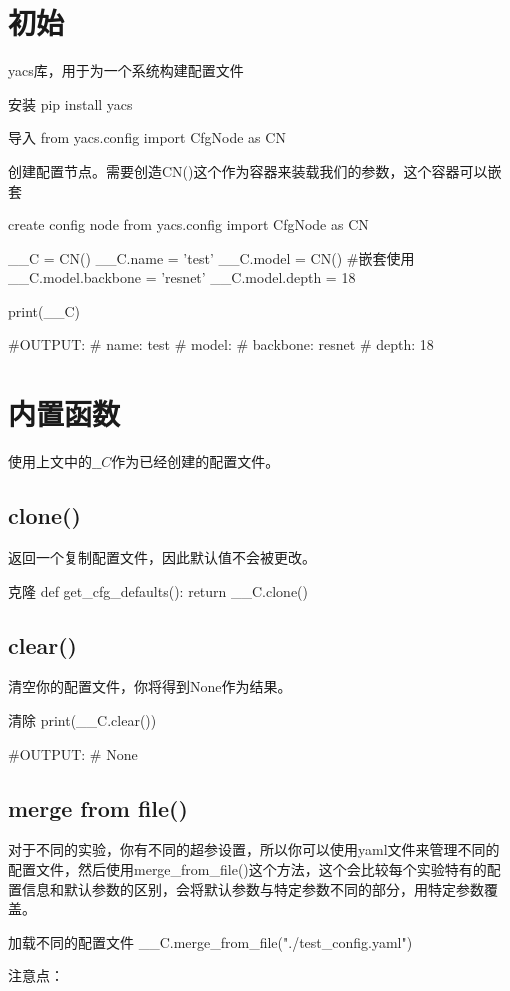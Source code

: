 \documentclass[11pt]{article}
\begin{document}
\section{初始}
yacs库，用于为一个系统构建配置文件
	\begin{Python}{安装}
	pip install yacs
	\end{Python}
	\begin{Python}{导入}
	from yacs.config import CfgNode as CN
	\end{Python}
创建配置节点。需要创造CN()这个作为容器来装载我们的参数，这个容器可以嵌套
	\begin{Python}{create config node}
	from yacs.config import CfgNode as CN

	__C = CN()
	__C.name = 'test'
	__C.model = CN() #嵌套使用
	__C.model.backbone = 'resnet'
	__C.model.depth = 18
	
	print(__C)
	
	#OUTPUT:
	#		name: test
	#		model:
	#			backbone: resnet
	#			depth: 18
	\end{Python}
\section{内置函数}
使用上文中的$\_\_C$作为已经创建的配置文件。
\subsection{clone()}
返回一个复制配置文件，因此默认值不会被更改。
	\begin{Python}{克隆}
	def get_cfg_defaults():
		return __C.clone()
	\end{Python}
\subsection{clear()}
清空你的配置文件，你将得到None作为结果。
	\begin{Python}{清除}
	print(__C.clear())
		
	#OUTPUT:
	#		None
	\end{Python}
\subsection{merge from file()}
对于不同的实验，你有不同的超参设置，所以你可以使用yaml文件来管理不同的配置文件，然后使用merge\_from\_file()这个方法，这个会比较每个实验特有的配置信息和默认参数的区别，会将默认参数与特定参数不同的部分，用特定参数覆盖。
	\begin{Python}{加载不同的配置文件}
	__C.merge_from_file("./test_config.yaml")
	\end{Python}
注意点：
\end{document}
